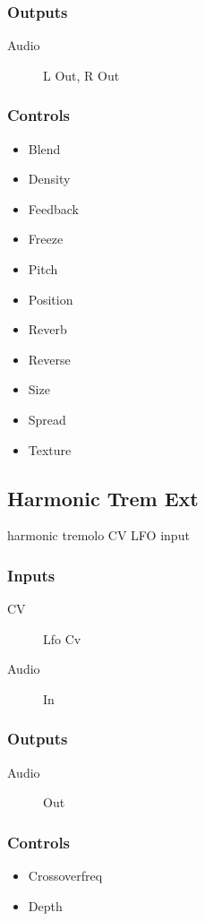 \subsubsection{Outputs}
\begin{description}
\item [Audio] L Out, R Out
\end{description}

\subsubsection{Controls}
\begin{itemize}
\item Blend
\item Density
\item Feedback
\item Freeze
\item Pitch
\item Position
\item Reverb
\item Reverse
\item Size
\item Spread
\item Texture
\end{itemize}

\subsection{Harmonic Trem Ext}

harmonic tremolo CV LFO input



\subsubsection{Inputs}
\begin{description}
\item [CV] Lfo Cv
\item [Audio] In
\end{description}

\subsubsection{Outputs}
\begin{description}
\item [Audio] Out
\end{description}

\subsubsection{Controls}
\begin{itemize}
\item Crossoverfreq
\item Depth
\end{itemize}

